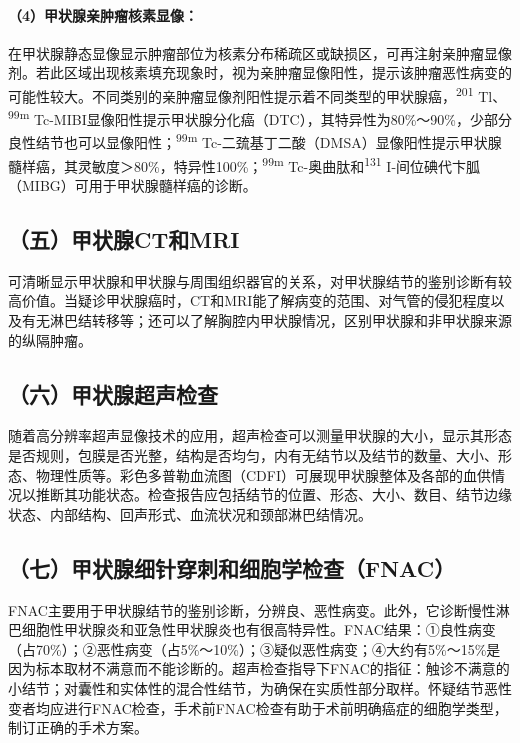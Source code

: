 \paragraph{（4）甲状腺亲肿瘤核素显像：}

在甲状腺静态显像显示肿瘤部位为核素分布稀疏区或缺损区，可再注射亲肿瘤显像剂。若此区域出现核素填充现象时，视为亲肿瘤显像阳性，提示该肿瘤恶性病变的可能性较大。不同类别的亲肿瘤显像剂阳性提示着不同类型的甲状腺癌，\textsuperscript{201}
Tl、\textsuperscript{99m}
Tc-MIBI显像阳性提示甲状腺分化癌（DTC），其特异性为80\%～90\%，少部分良性结节也可以显像阳性；\textsuperscript{99m}
Tc-二巯基丁二酸（DMSA）显像阳性提示甲状腺髓样癌，其灵敏度＞80\%，特异性100\%；\textsuperscript{99m}
Tc-奥曲肽和\textsuperscript{131}
I-间位碘代卞胍（MIBG）可用于甲状腺髓样癌的诊断。

\subsection{（五）甲状腺CT和MRI}

可清晰显示甲状腺和甲状腺与周围组织器官的关系，对甲状腺结节的鉴别诊断有较高价值。当疑诊甲状腺癌时，CT和MRI能了解病变的范围、对气管的侵犯程度以及有无淋巴结转移等；还可以了解胸腔内甲状腺情况，区别甲状腺和非甲状腺来源的纵隔肿瘤。

\subsection{（六）甲状腺超声检查}

随着高分辨率超声显像技术的应用，超声检查可以测量甲状腺的大小，显示其形态是否规则，包膜是否光整，结构是否均匀，内有无结节以及结节的数量、大小、形态、物理性质等。彩色多普勒血流图（CDFI）可展现甲状腺整体及各部的血供情况以推断其功能状态。检查报告应包括结节的位置、形态、大小、数目、结节边缘状态、内部结构、回声形式、血流状况和颈部淋巴结情况。

\subsection{（七）甲状腺细针穿刺和细胞学检查（FNAC）}

FNAC主要用于甲状腺结节的鉴别诊断，分辨良、恶性病变。此外，它诊断慢性淋巴细胞性甲状腺炎和亚急性甲状腺炎也有很高特异性。FNAC结果：①良性病变（占70\%）；②恶性病变（占5\%～10\%）；③疑似恶性病变；④大约有5\%～15\%是因为标本取材不满意而不能诊断的。超声检查指导下FNAC的指征：触诊不满意的小结节；对囊性和实体性的混合性结节，为确保在实质性部分取样。怀疑结节恶性变者均应进行FNAC检查，手术前FNAC检查有助于术前明确癌症的细胞学类型，制订正确的手术方案。

